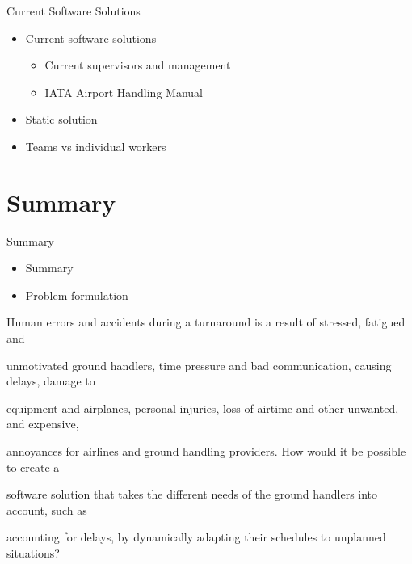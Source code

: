 \begin{frame}{Current Software Solutions}
    \begin{itemize}
        \item{Current software solutions}
        \begin{itemize}
            \item{Current supervisors and management}
            \item{IATA Airport Handling Manual}
        \end{itemize}
        \item{Static solution}
        \item{Teams vs individual workers}
    \end{itemize}
\end{frame}

\section{Summary}
\begin{frame}{Summary}
    \begin{itemize}
        \item{Summary}
        \item{Problem formulation}
    \end{itemize}

    \centerline{\tiny Human errors and accidents during a turnaround is a result of stressed, fatigued and}
    \centerline{\tiny unmotivated ground handlers, time pressure and bad communication, causing delays, damage to}
    \centerline{\tiny equipment and airplanes, personal injuries, loss of airtime and other unwanted, and expensive,}
    \centerline{\tiny annoyances for airlines and ground handling providers. How would it be possible to create a}
    \centerline{\tiny software solution that takes the different needs of the ground handlers into account, such as}
    \centerline{\tiny accounting for delays, by dynamically adapting their schedules to unplanned situations?}
\end{frame}

